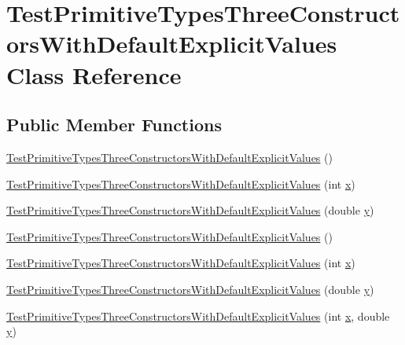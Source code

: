 \hypertarget{classTestPrimitiveTypesThreeConstructorsWithDefaultExplicitValues}{
\section{TestPrimitiveTypesThreeConstructorsWithDefaultExplicitValues Class Reference}
\label{classTestPrimitiveTypesThreeConstructorsWithDefaultExplicitValues}
}
\subsection*{Public Member Functions}
\begin{DoxyCompactItemize}
\item 
\hyperlink{classTestPrimitiveTypesThreeConstructorsWithDefaultExplicitValues_a09344661faa060ae7294583418959a76}{TestPrimitiveTypesThreeConstructorsWithDefaultExplicitValues} ()
\item 
\hyperlink{classTestPrimitiveTypesThreeConstructorsWithDefaultExplicitValues_ad41774de7682e9f1aa7160eda426b2d1}{TestPrimitiveTypesThreeConstructorsWithDefaultExplicitValues} (int \hyperlink{classTestPrimitiveTypesThreeConstructorsWithDefaultExplicitValues_a546ef6f93619697ea31aaa5d4039c52e}{x})
\item 
\hyperlink{classTestPrimitiveTypesThreeConstructorsWithDefaultExplicitValues_ad18400e8df573ae75114a912206c88b6}{TestPrimitiveTypesThreeConstructorsWithDefaultExplicitValues} (double \hyperlink{classTestPrimitiveTypesThreeConstructorsWithDefaultExplicitValues_ad18f6bf3076e7c42bb6b3d32e5639723}{y})
\item 
\hyperlink{classTestPrimitiveTypesThreeConstructorsWithDefaultExplicitValues_a09344661faa060ae7294583418959a76}{TestPrimitiveTypesThreeConstructorsWithDefaultExplicitValues} ()
\item 
\hyperlink{classTestPrimitiveTypesThreeConstructorsWithDefaultExplicitValues_ad41774de7682e9f1aa7160eda426b2d1}{TestPrimitiveTypesThreeConstructorsWithDefaultExplicitValues} (int \hyperlink{classTestPrimitiveTypesThreeConstructorsWithDefaultExplicitValues_a546ef6f93619697ea31aaa5d4039c52e}{x})
\item 
\hyperlink{classTestPrimitiveTypesThreeConstructorsWithDefaultExplicitValues_ad18400e8df573ae75114a912206c88b6}{TestPrimitiveTypesThreeConstructorsWithDefaultExplicitValues} (double \hyperlink{classTestPrimitiveTypesThreeConstructorsWithDefaultExplicitValues_ad18f6bf3076e7c42bb6b3d32e5639723}{y})
\item 
\hyperlink{classTestPrimitiveTypesThreeConstructorsWithDefaultExplicitValues_a8029847d07f1914cc62b6446e8efceab}{TestPrimitiveTypesThreeConstructorsWithDefaultExplicitValues} (int \hyperlink{classTestPrimitiveTypesThreeConstructorsWithDefaultExplicitValues_a546ef6f93619697ea31aaa5d4039c52e}{x}, double \hyperlink{classTestPrimitiveTypesThreeConstructorsWithDefaultExplicitValues_ad18f6bf3076e7c42bb6b3d32e5639723}{y})
\end{DoxyCompactItemize}
